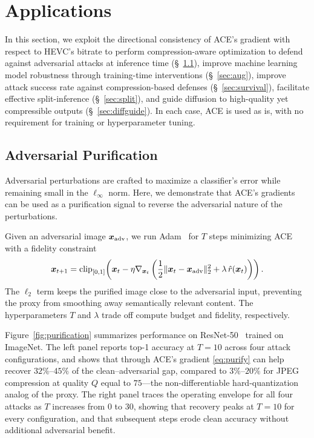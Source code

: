 \section{Applications}
\label{sec:applications}

In this section, we exploit the directional consistency of ACE's gradient with respect to HEVC's bitrate to perform compression-aware optimization to defend against adversarial attacks at inference time (\S~\ref{sec:adv_pur}), improve machine learning model robustness through training-time interventions (\S~\ref{sec:aug}), improve attack success rate against compression-based defenses (\S~\ref{sec:survival}), facilitate effective split-inference (\S~\ref{sec:split}), and guide diffusion to high-quality yet compressible outputs (\S~\ref{sec:diffguide}).
In each case, ACE is used as is, with no requirement for training or hyperparameter tuning.

\subsection{Adversarial Purification}\label{sec:adv_pur}

Adversarial perturbations are crafted to maximize a classifier's error while remaining small in the $\ell_\infty$ norm.
Here, we demonstrate that ACE's gradients can be used as a purification signal to reverse the adversarial nature of the perturbations.

Given an adversarial image $\boldsymbol{x}_\mathrm{adv}$, we run Adam~\citep{kingma2014adam} for $T$ steps minimizing ACE with a fidelity constraint
\begin{equation}
  \boldsymbol{x}_{t+1} = \mathrm{clip}_{[0,1]}\!\left(
    \boldsymbol{x}_t - \eta\nabla_{\boldsymbol{x}_t}
    \left(\frac{1}{2}\|\boldsymbol{x}_t - \boldsymbol{x}_\mathrm{adv}\|_2^2
          + \lambda\,\hat{r}(\boldsymbol{x}_t)\right)
  \right).
  \label{eq:purify}
\end{equation}
The $\ell_2$ term keeps the purified image close to the adversarial input, preventing the proxy from smoothing away semantically relevant content.
The hyperparameters $T$ and $\lambda$ trade off compute budget and fidelity, respectively.

Figure~\ref{fig:purification} summarizes performance on ResNet-50~\citep{he2016resnet} trained on ImageNet.
The left panel reports top-1 accuracy at $T=10$ across four attack configurations, and shows that through ACE's gradient \eqref{eq:purify} can help recover $32\%$--$45\%$ of the clean--adversarial gap, compared to $3\%$--$20\%$ for JPEG compression at quality $Q$ equal to $75$---the non-differentiable hard-quantization analog of the proxy.
The right panel traces the operating envelope for all four attacks as $T$ increases from $0$ to $30$, showing that recovery peaks at $T=10$ for every configuration, and that subsequent steps erode clean accuracy without additional adversarial benefit.

